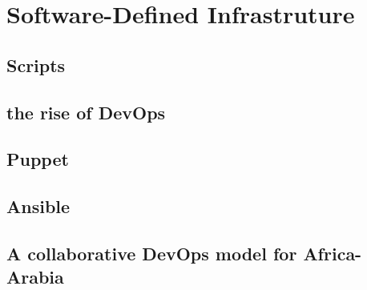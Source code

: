 \section{Software-Defined Infrastruture}

\subsection{Scripts}

\subsection{the rise of DevOps}


\subsection{Puppet}


\subsection{Ansible}




\subsection{A collaborative DevOps model for Africa-Arabia}
